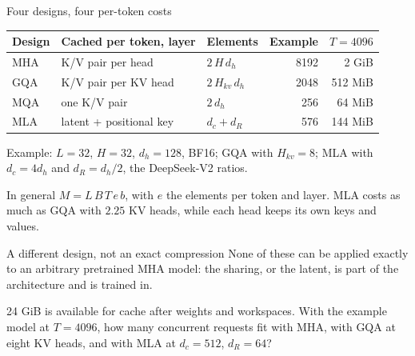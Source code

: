 \documentclass[handout]{beamer}
\begin{document}
\begin{frame}{Four designs, four per-token costs}
  \small
  \begin{tabular}{@{}l>{\raggedright\arraybackslash}p{.31\linewidth}lrr@{}}
    \toprule
    Design & Cached per token, layer & Elements & Example & $T=4096$ \\
    \midrule
    MHA & K/V pair per head & $2\,H\,d_h$ & 8192 & 2 GiB \\
    GQA & K/V pair per KV head & $2\,H_{kv}\,d_h$ & 2048 & 512 MiB \\
    MQA & one K/V pair & $2\,d_h$ & 256 & 64 MiB \\
    MLA & latent + positional key & $d_c+d_R$ & 576 & 144 MiB \\
    \bottomrule
  \end{tabular}
  \par\vspace{4pt}
  \footnotesize Example: $L=32$, $H=32$, $d_h=128$, BF16; GQA with $H_{kv}=8$; MLA with $d_c=4d_h$ and $d_R=d_h/2$, the DeepSeek-V2 ratios.
  \par\vspace{5pt}
  \small In general $M=L\,B\,T\,e\,b$, with $e$ the elements per token and layer. MLA costs as much as GQA with $2.25$ KV heads, while each head keeps its own keys and values.
  \begin{alertblock}{A different design, not an exact compression}
    \small None of these can be applied exactly to an arbitrary pretrained MHA model: the sharing, or the latent, is part of the architecture and is trained in.
  \end{alertblock}
\end{frame}

{24 GiB is available for cache after weights and workspaces. With the example model at $T=4096$, how many concurrent requests fit with MHA, with GQA at eight KV heads, and with MLA at $d_c=512$, $d_R=64$?}
\end{document}
